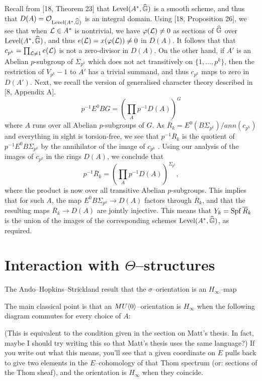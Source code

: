 Recall from [18, Theorem 23] that $\operatorname{Level}(A^*,\widehat{\mathbb G})$ is a smooth scheme, and thus that $D(A) = \mathcal{O}_{\operatorname{Level}(A^*,\widehat{\mathbb G})}$ is an integral domain. Using [18, Proposition 26], we see that when $\mathcal{L} \in A^*$ is nontrivial, we have $\varphi(\mathcal{L}) \ne 0$ as sections of $\widehat{\mathbb G}$ over $\operatorname{Level}(A^*, \widehat{\mathbb G})$, and thus $e(\mathcal{L}) = x(\varphi(\mathcal{L})) \ne 0$ in $D(A)$. It follows that that $c_{p^k} = \prod_{\mathcal{L} \ne 1} e(\mathcal{L})$ is not a zero-divisor in $D(A)$. On the other hand, if $A'$ is an Abelian $p$-subgroup of $\Sigma_{p^k}$ which does not act transitively on $\{1, \ldots, p^k\}$, then the restriction of $V_{p^k} − 1$ to $A'$ has a trivial summand, and thus $c_{p^k}$ maps to zero in $D(A')$. Next, we recall the version of generalised character theory described in [8, Appendix A].
\[p^{-1} E^0 BG = \left(\prod_A p^{-1} D(A)\right)^G\]
where $A$ runs over all Abelian $p$-subgroups of $G$. As $\overline R_k = E^0(B\Sigma_{p^k} )/ ann(c_{p^k} )$ and everything in sight is torsion-free, we see that $p^{−1} \overline R_k$ is the quotient of $p^{−1}E^0B\Sigma_{p^k}$ by the annihilator of the image of $c_{p^k}$ . Using our analysis of the images of $c_{p^k}$ in the rings $D(A)$, we conclude that
\[p^{-1} \overline R_k = \left(\prod_A p^{−1}D(A)\right)^{\Sigma_{p^k}},\]
where the product is now over all transitive Abelian $p$-subgroups. This implies that for such $A$, the map $E^0B\Sigma_{p^k} \to D(A)$ factors through $\overline R_k$, and that the resulting maps $\overline R_k \to D(A)$ are jointly injective. This means that $Y_k = \operatorname{Spf} \overline R_k$ is the union of the images of the corresponding schemes $\operatorname{Level}(A^*,\widehat{\mathbb G})$, as required.








\section{Interaction with $\Theta$--structures}

The Ando--Hopkins--Strickland result that the $\sigma$--orientation is an $H_\infty$--map

The main classical point is that an $MU\langle0\rangle$--orientation is $H_\infty$ when the following diagram commutes for every choice of $A$:
\begin{center}
\end{center}
(This is equivalent to the condition given in the section on Matt's thesis.  In fact, maybe I should try writing this so that Matt's thesis uses the same language?)  If you write out what this means, you'll see that a given coordinate on $E$ pulls back to give two elements in the $E$--cohomology of that Thom spectrum (or: sections of the Thom sheaf), and the orientation is $H_\infty$ when they coincide.

